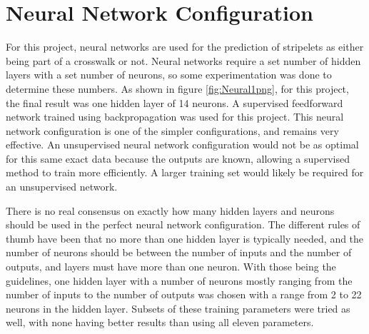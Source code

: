 \documentclass[12pt]{ucthesis}
\begin{document}
\section{Neural Network Configuration}
For this project, neural networks are used for the prediction of stripelets as either being part of a crosswalk or not. Neural networks require a set number of hidden layers with a set number of neurons, so some experimentation was done to determine these numbers. As shown in figure \ref{fig:Neural1png}, for this project, the final result was one hidden layer of 14 neurons. A supervised feedforward network trained using backpropagation was used for this project. This neural network configuration is one of the simpler configurations, and remains very effective. An unsupervised neural network configuration would not be as optimal for this same exact data because the outputs are known, allowing a supervised method to train more efficiently. A larger training set would likely be required for an unsupervised network. 

 

There is no real consensus on exactly how many hidden layers and neurons should be used in the perfect neural network configuration. The different rules of thumb have been that no more than one hidden layer is typically needed, and the number of neurons should be between the number of inputs and the number of outputs, and layers must have more than one neuron\cite{Heaton:2008:INN:1502373}. With those being the guidelines, one hidden layer with a number of neurons mostly ranging from the number of inputs to the number of outputs was chosen with a range from 2 to 22 neurons in the hidden layer. Subsets of these training parameters were tried as well, with none having better results than using all eleven parameters. 
\end{document}
